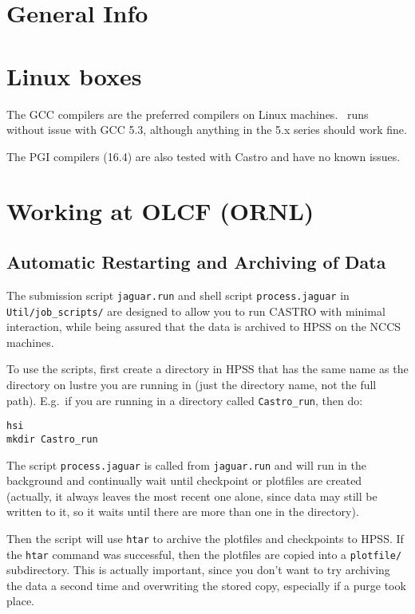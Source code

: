 \section{General Info}


\section{Linux boxes}

The GCC compilers are the preferred compilers on Linux machines.
\castro\ runs without issue with GCC 5.3, although anything in the 5.x
series should work fine.

The PGI compilers (16.4) are also tested with Castro and have no known
issues.

\section{Working at OLCF (ORNL)}


\subsection{Automatic Restarting and Archiving of Data}

The submission script {\tt jaguar.run} and shell script
{\tt process.jaguar} in {\tt Util/job\_scripts/}
are designed to allow you to run CASTRO with minimal interaction,
while being assured that the data is archived to HPSS on the NCCS
machines.

To use the scripts, first create a directory in HPSS that has the same
name as the directory on lustre you are running in (just the directory
name, not the full path).  E.g.\ if you are running in a directory
called {\tt Castro\_run}, then do:
\begin{verbatim}
hsi
mkdir Castro_run
\end{verbatim}

The script {\tt process.jaguar} is called from {\tt jaguar.run} and
will run in the background and continually wait until checkpoint or
plotfiles are created (actually, it always leaves the most recent one
alone, since data may still be written to it, so it waits until there
are more than one in the directory).

Then the script will use {\tt htar} to archive the plotfiles and checkpoints
to HPSS.  If the {\tt htar} command was successful, then the plotfiles are
copied into a {\tt plotfile/} subdirectory.  This is actually important,
since you don't want to try archiving the data a second time and
overwriting the stored copy, especially if a purge took place.

